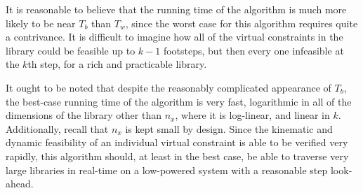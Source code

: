 It is reasonable to believe that the running time of the algorithm is much more likely to be near $T_b$ than $T_w$, since the worst case for this algorithm requires quite a contrivance. It is difficult to imagine how all of the virtual constraints in the library could be feasible up to $k-1$ footsteps, but then every one infeasible at the $k$th step, for a rich and practicable library.

It ought to be noted that despite the reasonably complicated appearance of $T_b$, the best-case running time of the algorithm is very fast, logarithmic in all of the dimensions of the library other than $n_x$, where it is log-linear, and linear in $k$. Additionally, recall that $n_x$ is kept small by design. Since the kinematic and dynamic feasibility of an individual virtual constraint is able to be verified very rapidly, this algorithm should, at least in the best case, be able to traverse very large libraries in real-time on a low-powered system with a reasonable step look-ahead.